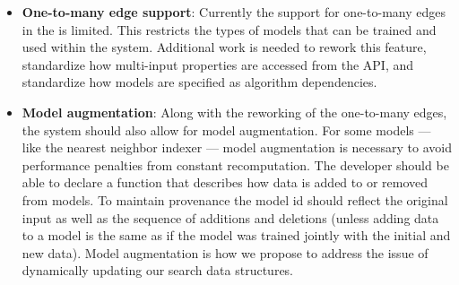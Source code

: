     \begin{itemize}

        \item \textbf{One-to-many edge support}:
        Currently the support for one-to-many edges in the \depcache{} is
          limited.
        This restricts the types of models that can be trained and used within
          the system.
        Additional work is needed to rework this feature, standardize how
          multi-input properties are accessed from the \depcache{} API{}, and
          standardize how models are specified as algorithm dependencies.
            

        \item \textbf{Model augmentation}:
        Along with the reworking of the one-to-many edges, the system should
          also allow for model augmentation.
        For some models --- like the nearest neighbor indexer --- model
          augmentation is necessary to avoid performance penalties from constant
          recomputation.
        The developer should be able to declare a function that describes how
          data is added to or removed from models.
        To maintain provenance the model id should reflect the original input
          as well as the sequence of additions and deletions (unless adding data
          to a model is the same as if the model was trained jointly with the
          initial and new data).
        Model augmentation is how we propose to address the issue of
          dynamically updating our search data structures.




\end{itemize}
